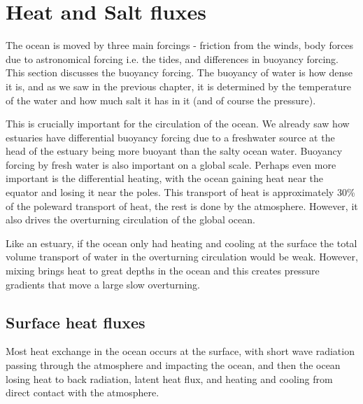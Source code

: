 
\chapter{Heat and Salt fluxes}
\label{ch:heatsaltflux}

The ocean is moved by three main forcings - friction from the winds, body forces due to astronomical forcing i.e. the tides, and differences in buoyancy forcing.  This section discusses the buoyancy forcing.  The buoyancy of water is how dense it is, and as we saw in the previous chapter, it is determined by the temperature of the water and how much salt it has in it (and of course the pressure).  

This is crucially important for the circulation of the ocean.  We already saw how estuaries have differential buoyancy forcing due to a freshwater source at the head of the estuary being more buoyant than the salty ocean water.  Buoyancy forcing by fresh water is also important on a global scale.  Perhaps even more important is the differential heating, with the ocean gaining heat near the equator and losing it near the poles.  This transport of heat is approximately 30\% of the poleward transport of heat, the rest is done by the atmosphere.  However, it also drives the overturning circulation of the global ocean. 

Like an estuary, if the ocean only had heating and cooling at the surface the total volume transport of water in the overturning circulation would be weak.  However, mixing brings heat to great depths in the ocean and this creates pressure gradients that move a large slow overturning.


\section{Surface heat fluxes}

Most heat exchange in the ocean occurs at the surface, with short wave radiation passing through the atmosphere and impacting the ocean, and then the ocean losing heat to back radiation, latent heat flux, and heating and cooling from direct contact with the atmosphere.

